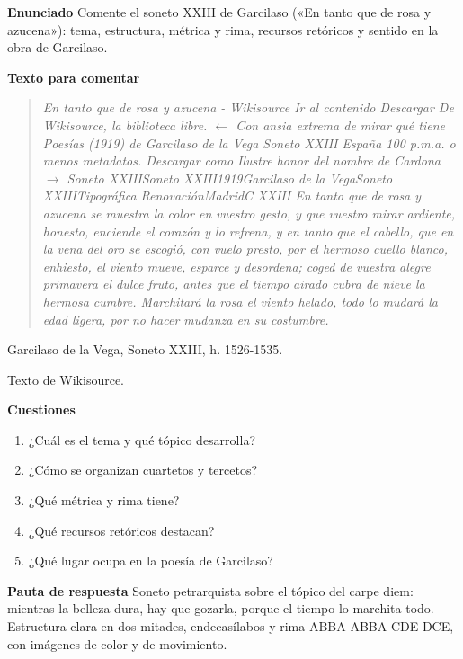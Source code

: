 \documentclass{book}
\begin{document}
\begin{tcolorbox}[title={Ejercicio resuelto}, studiumworked, breakable]

\noindent\textbf{Enunciado}
Comente el soneto XXIII de Garcilaso («En tanto que de rosa y azucena»): tema, estructura, métrica y rima, recursos retóricos y sentido en la obra de Garcilaso.


\noindent\textbf{Texto para comentar}

\begin{quote}
\itshape En tanto que de rosa y azucena - Wikisource Ir al contenido Descargar De Wikisource, la biblioteca libre. \(\leftarrow\) Con ansia extrema de mirar qué tiene Poesías (1919) de Garcilaso de la Vega Soneto XXIII España 100 p.m.a. o menos metadatos. Descargar como Ilustre honor del nombre de Cardona \(\to\) Soneto XXIIISoneto XXIII1919Garcilaso de la VegaSoneto XXIIITipográfica RenovaciónMadridC XXIII En tanto que de rosa y azucena se muestra la color en vuestro gesto, y que vuestro mirar ardiente, honesto, enciende el corazón y lo refrena, y en tanto que el cabello, que en la vena del oro se escogió, con vuelo presto, por el hermoso cuello blanco, enhiesto, el viento mueve, esparce y desordena; coged de vuestra alegre primavera el dulce fruto, antes que el tiempo airado cubra de nieve la hermosa cumbre. Marchitará la rosa el viento helado, todo lo mudará la edad ligera, por no hacer mudanza en su costumbre.
\end{quote}
{\noindent\footnotesize Garcilaso de la Vega, Soneto XXIII, h. 1526-1535.\par}
{\noindent\footnotesize Texto de Wikisource.\par}

\noindent\textbf{Cuestiones}
\begin{enumerate}
\item ¿Cuál es el tema y qué tópico desarrolla?
\item ¿Cómo se organizan cuartetos y tercetos?
\item ¿Qué métrica y rima tiene?
\item ¿Qué recursos retóricos destacan?
\item ¿Qué lugar ocupa en la poesía de Garcilaso?
\end{enumerate}

\noindent\textbf{Pauta de respuesta}
Soneto petrarquista sobre el tópico del carpe diem: mientras la belleza dura, hay que gozarla, porque el tiempo lo marchita todo. Estructura clara en dos mitades, endecasílabos y rima ABBA ABBA CDE DCE, con imágenes de color y de movimiento.



\end{tcolorbox}
\end{document}
